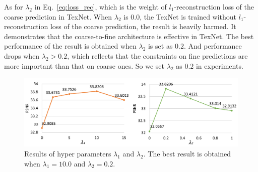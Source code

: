 As for $\lambda_2$ in Eq.~\eqref{eq:loss_rec}, which is the weight of $l_1$-reconstruction loss of the coarse prediction in TexNet. When $\lambda_2$ is $0.0$, the TexNet is trained without $l_1$-reconstruction loss of the coarse prediction, the result is heavily harmed. It demonstrates that the coarse-to-fine architecture is effective in TexNet. The best performance of the result is obtained when $\lambda_2$ is set as $0.2$. And performance drops when $\lambda_2>0.2$, which reflects that the constraints on fine predictions are more important than that on coarse ones.
So we set $\lambda_2$ as $0.2$ in experiments.




\begin{figure}[!t]
	\centering
	\includegraphics[width=1.0\columnwidth]{lamda1} %
	\caption{Results of hyper parameters $\lambda_1$ and $\lambda_2$. The best result is obtained when $\lambda_1=10.0$ and $\lambda_2=0.2$.}
	\label{fig:hparam}
\end{figure}






 

